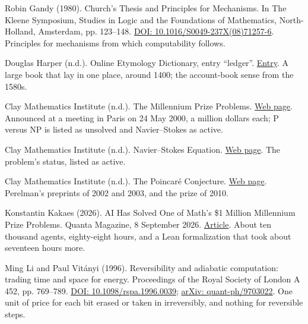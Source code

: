 \documentclass[11pt,twoside]{article}
\theoremstyle{thielethm}
\theoremstyle{thieledef}
\theoremstyle{thieledef}
\theoremstyle{thieledef}
\theoremstyle{thielethm}
\theoremstyle{thieleobs}
\theoremstyle{thielethm}
\begin{document}
\noindent Robin Gandy (1980). Church's Thesis and Principles for Mechanisms. In The Kleene Symposium, Studies in Logic and the Foundations of Mathematics, North-Holland, Amsterdam, pp. 123--148. \href{https://doi.org/10.1016/S0049-237X(08)71257-6}{DOI: 10.1016/S0049-237X(08)71257-6}. Principles for mechanisms from which computability follows.
\par\medskip

\noindent Douglas Harper (n.d.). Online Etymology Dictionary, entry ``ledger''. \href{https://www.etymonline.com/word/ledger}{Entry}. A large book that lay in one place, around 1400; the account-book sense from the 1580s.
\par\medskip

\noindent Clay Mathematics Institute (n.d.). The Millennium Prize Problems. \href{https://www.claymath.org/millennium-problems/}{Web page}. Announced at a meeting in Paris on 24 May 2000, a million dollars each; P versus NP is listed as unsolved and Navier--Stokes as active.
\par\medskip

\noindent Clay Mathematics Institute (n.d.). Navier--Stokes Equation. \href{https://www.claymath.org/millennium/navier-stokes-equation/}{Web page}. The problem's status, listed as active.
\par\medskip

\noindent Clay Mathematics Institute (n.d.). The Poincar\'e Conjecture. \href{https://www.claymath.org/millennium/poincare-conjecture/}{Web page}. Perelman's preprints of 2002 and 2003, and the prize of 2010.
\par\medskip

\noindent Konstantin Kakaes (2026). AI Has Solved One of Math's \$1 Million Millennium Prize Problems. Quanta Magazine, 8 September 2026. \href{https://www.quantamagazine.org/ai-has-solved-one-of-maths-1-million-millennium-prize-problems-20260908/}{Article}. About ten thousand agents, eighty-eight hours, and a Lean formalization that took about seventeen hours more.
\par\medskip

\noindent Ming Li and Paul Vit\'anyi (1996). Reversibility and adiabatic computation: trading time and space for energy. Proceedings of the Royal Society of London A 452, pp. 769--789. \href{https://doi.org/10.1098/rspa.1996.0039}{DOI: 10.1098/rspa.1996.0039}; \href{https://arxiv.org/abs/quant-ph/9703022}{arXiv: quant-ph/9703022}. One unit of price for each bit erased or taken in irreversibly, and nothing for reversible steps.
\par\medskip
\end{document}
